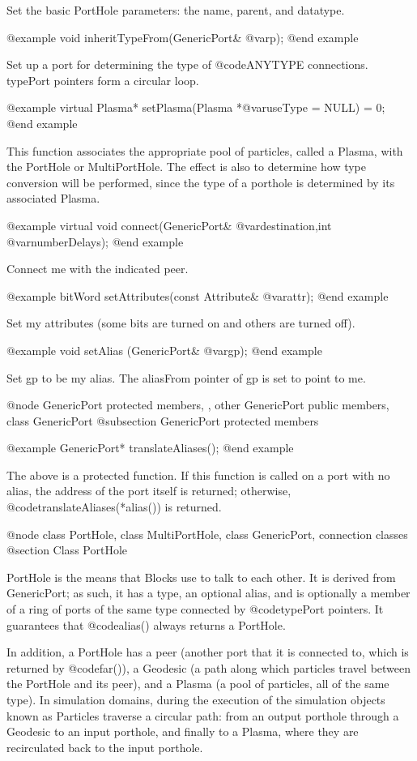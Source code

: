 Set the basic PortHole parameters: the name, parent, and datatype.

@example
void inheritTypeFrom(GenericPort& @var{p});
@end example

Set up a port for determining the type of @code{ANYTYPE} connections.
typePort pointers form a circular loop.

@example
virtual Plasma* setPlasma(Plasma *@var{useType} = NULL) = 0;
@end example

This function associates the appropriate pool of particles, called a
Plasma, with the PortHole or MultiPortHole.  The effect is also to
determine how type conversion will be performed, since the type of
a porthole is determined by its associated Plasma.

@example
virtual void connect(GenericPort& @var{destination},int @var{numberDelays});
@end example

Connect me with the indicated peer.

@example
bitWord setAttributes(const Attribute& @var{attr});
@end example

Set my attributes (some bits are turned on and others are turned off).

@example
void setAlias (GenericPort& @var{gp});
@end example

Set gp to be my alias.  The aliasFrom pointer of gp is set to
point to me.

@node GenericPort protected members,  , other GenericPort public members, class GenericPort
@subsection GenericPort protected members

@example
GenericPort* translateAliases();
@end example

The above is a protected function.  If this function is called on
a port with no alias, the address of the port itself is returned;
otherwise, @code{translateAliases(*alias())} is returned.

@node class PortHole, class MultiPortHole, class GenericPort, connection classes
@section Class PortHole

PortHole is the means that Blocks use to talk to each other.  It is
derived from GenericPort; as such, it has a type, an optional alias,
and is optionally a member of a ring of ports of the same type connected
by @code{typePort} pointers.  It guarantees that @code{alias()} always
returns a PortHole.

In addition, a PortHole has a peer (another port that it is connected
to, which is returned by @code{far()}), a Geodesic (a path along which
particles travel between the PortHole and its peer), and a Plasma (a
pool of particles, all of the same type).  In simulation domains,
during the execution of the simulation objects known as Particles
traverse a circular path: from an output porthole through a Geodesic to
an input porthole, and finally to a Plasma, where they are recirculated
back to the input porthole.

